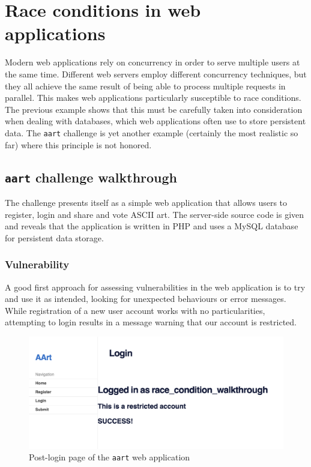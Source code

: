 \section{Race conditions in web applications}

Modern web applications rely on concurrency in order to serve multiple users at the same time. Different web servers employ different concurrency techniques, but they all achieve the same result of being able to process multiple requests in parallel. This makes web applications particularly susceptible to race conditions. \\

The previous example shows that this must be carefully taken into consideration when dealing with databases, which web applications often use to store persistent data. The \texttt{aart} challenge is yet another example (certainly the most realistic so far) where this principle is not honored.

\subsection{\texttt{aart} challenge walkthrough}

The challenge presents itself as a simple web application that allows users to register, login and share and vote ASCII art. The server-side source code is given and reveals that the application is written in PHP and uses a MySQL database for persistent data storage. \\

\subsubsection{Vulnerability}
 
A good first approach for assessing vulnerabilities in the web application is to try and use it as intended, looking for unexpected behaviours or error messages. While registration of a new user account works with no particularities, attempting to login results in a message warning that our account is restricted.

\begin{figure}[h]
\includegraphics[width=\textwidth]{img/aart_login.png}
\caption{Post-login page of the \texttt{aart} web application}
\label{fig:aartlogin}
\end{figure}

